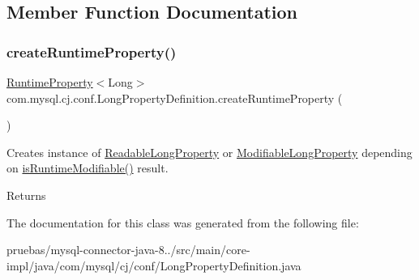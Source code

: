 \subsection{Member Function Documentation}
\mbox{\label{classcom_1_1mysql_1_1cj_1_1conf_1_1_long_property_definition_a62dc153cd1b58382888d34b61cdb531c}} 
\subsubsection{\texorpdfstring{create\+Runtime\+Property()}{createRuntimeProperty()}}
{\footnotesize\ttfamily \mbox{\hyperlink{interfacecom_1_1mysql_1_1cj_1_1conf_1_1_runtime_property}{Runtime\+Property}}$<$Long$>$ com.\+mysql.\+cj.\+conf.\+Long\+Property\+Definition.\+create\+Runtime\+Property (\begin{DoxyParamCaption}{ }\end{DoxyParamCaption})}

Creates instance of \mbox{\hyperlink{classcom_1_1mysql_1_1cj_1_1conf_1_1_readable_long_property}{Readable\+Long\+Property}} or \mbox{\hyperlink{classcom_1_1mysql_1_1cj_1_1conf_1_1_modifiable_long_property}{Modifiable\+Long\+Property}} depending on \mbox{\hyperlink{classcom_1_1mysql_1_1cj_1_1conf_1_1_abstract_property_definition_a6c98140b2db84ccd0ff29ce165ec9ef5}{is\+Runtime\+Modifiable()}} result.

\begin{DoxyReturn}{Returns}

\end{DoxyReturn}


The documentation for this class was generated from the following file\+:\begin{DoxyCompactItemize}
\item 
pruebas/mysql-\/connector-\/java-\/8../src/main/core-\/impl/java/com/mysql/cj/conf/Long\+Property\+Definition.\+java\end{DoxyCompactItemize}
